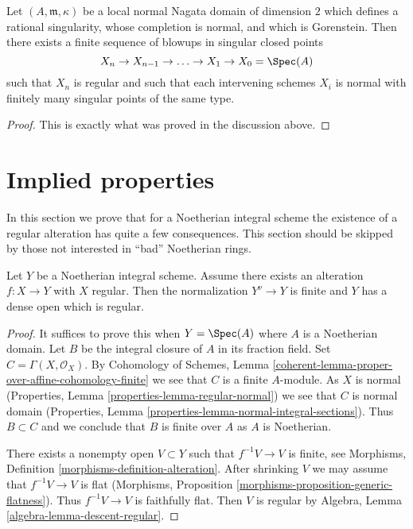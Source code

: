 \begin{lemma}
\label{lemma-resolve-rational-double-points}
Let $(A, \mathfrak m, \kappa)$ be a local normal Nagata
domain of dimension $2$ which defines a rational singularity,
whose completion is normal, and which is Gorenstein.
Then there exists a finite sequence of blowups in
singular closed points
$$
X_n \to X_{n - 1} \to \ldots \to X_1 \to X_0 = \Spec(A)
$$
such that $X_n$ is regular and such that each intervening
schemes $X_i$ is normal with finitely many singular points
of the same type.
\end{lemma}

\begin{proof}
This is exactly what was proved in the discussion above.
\end{proof}




\section{Implied properties}
\label{section-existence-gives}

\noindent
In this section we prove that for a Noetherian integral scheme
the existence of a regular alteration has quite a few consequences.
This section should be skipped by those not interested in
``bad'' Noetherian rings.

\begin{lemma}
\label{lemma-regular-alteration-implies}
Let $Y$ be a Noetherian integral scheme. Assume there exists an alteration
$f : X \to Y$ with $X$ regular. Then the normalization $Y^\nu \to Y$
is finite and $Y$ has a dense open which is regular.
\end{lemma}

\begin{proof}
It suffices to prove this when $Y = \Spec(A)$ where $A$ is a Noetherian domain.
Let $B$ be the integral closure of $A$ in its fraction field.
Set $C = \Gamma(X, \mathcal{O}_X)$. By
Cohomology of Schemes, Lemma
\ref{coherent-lemma-proper-over-affine-cohomology-finite}
we see that $C$ is a finite $A$-module. As $X$ is normal
(Properties, Lemma \ref{properties-lemma-regular-normal})
we see that $C$ is normal domain
(Properties, Lemma \ref{properties-lemma-normal-integral-sections}).
Thus $B \subset C$ and we conclude that $B$ is finite over $A$
as $A$ is Noetherian.

\medskip\noindent
There exists a nonempty open $V \subset Y$ such that $f^{-1}V \to V$
is finite, see Morphisms, Definition \ref{morphisms-definition-alteration}.
After shrinking $V$ we may assume that $f^{-1}V \to V$ is flat
(Morphisms, Proposition \ref{morphisms-proposition-generic-flatness}).
Thus $f^{-1}V \to V$ is faithfully flat. Then $V$ is regular by
Algebra, Lemma \ref{algebra-lemma-descent-regular}.
\end{proof}

